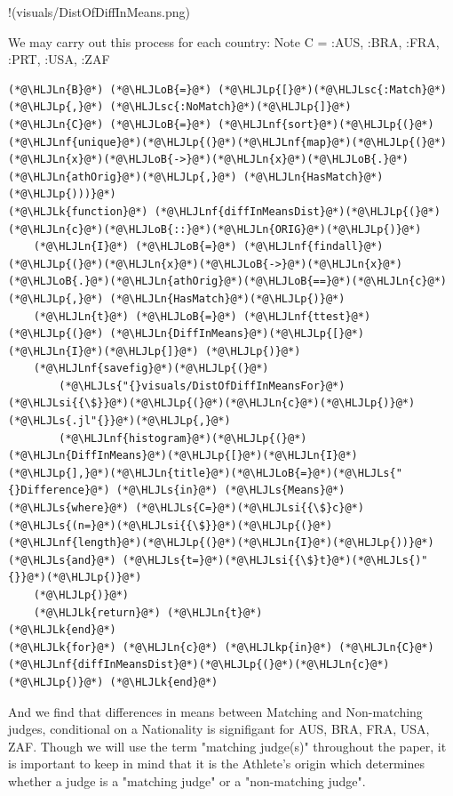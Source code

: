 \documentclass[12pt,a4paper]{article}
\newcommand{\HLJLk}[1]{\textcolor[RGB]{148,91,176}{\textbf{#1}}}
\newcommand{\HLJLkp}[1]{\textcolor[RGB]{148,91,176}{\textbf{#1}}}
\newcommand{\HLJLn}[1]{#1}
\newcommand{\HLJLnf}[1]{\textcolor[RGB]{66,102,213}{#1}}
\newcommand{\HLJLs}[1]{\textcolor[RGB]{201,61,57}{#1}}
\newcommand{\HLJLsc}[1]{\textcolor[RGB]{201,61,57}{#1}}
\newcommand{\HLJLsi}[1]{#1}
\newcommand{\HLJLoB}[1]{\textcolor[RGB]{102,102,102}{\textbf{#1}}}
\newcommand{\HLJLp}[1]{#1}
\begin{document}
!(visuals/DistOfDiffInMeans.png)


We may carry out this process for each country: Note C = :AUS, :BRA, :FRA, :PRT, :USA, :ZAF


\begin{lstlisting}
(*@\HLJLn{B}@*) (*@\HLJLoB{=}@*) (*@\HLJLp{[}@*)(*@\HLJLsc{:Match}@*)(*@\HLJLp{,}@*) (*@\HLJLsc{:NoMatch}@*)(*@\HLJLp{]}@*)
(*@\HLJLn{C}@*) (*@\HLJLoB{=}@*) (*@\HLJLnf{sort}@*)(*@\HLJLp{(}@*)(*@\HLJLnf{unique}@*)(*@\HLJLp{(}@*)(*@\HLJLnf{map}@*)(*@\HLJLp{(}@*)(*@\HLJLn{x}@*)(*@\HLJLoB{->}@*)(*@\HLJLn{x}@*)(*@\HLJLoB{.}@*)(*@\HLJLn{athOrig}@*)(*@\HLJLp{,}@*) (*@\HLJLn{HasMatch}@*)(*@\HLJLp{)))}@*)
(*@\HLJLk{function}@*) (*@\HLJLnf{diffInMeansDist}@*)(*@\HLJLp{(}@*)(*@\HLJLn{c}@*)(*@\HLJLoB{::}@*)(*@\HLJLn{ORIG}@*)(*@\HLJLp{)}@*)
	(*@\HLJLn{I}@*) (*@\HLJLoB{=}@*) (*@\HLJLnf{findall}@*)(*@\HLJLp{(}@*)(*@\HLJLn{x}@*)(*@\HLJLoB{->}@*)(*@\HLJLn{x}@*)(*@\HLJLoB{.}@*)(*@\HLJLn{athOrig}@*)(*@\HLJLoB{==}@*)(*@\HLJLn{c}@*)(*@\HLJLp{,}@*) (*@\HLJLn{HasMatch}@*)(*@\HLJLp{)}@*)
	(*@\HLJLn{t}@*) (*@\HLJLoB{=}@*) (*@\HLJLnf{ttest}@*)(*@\HLJLp{(}@*) (*@\HLJLn{DiffInMeans}@*)(*@\HLJLp{[}@*)(*@\HLJLn{I}@*)(*@\HLJLp{]}@*) (*@\HLJLp{)}@*)
	(*@\HLJLnf{savefig}@*)(*@\HLJLp{(}@*)
		(*@\HLJLs{"{}visuals/DistOfDiffInMeansFor}@*)(*@\HLJLsi{{\$}}@*)(*@\HLJLp{(}@*)(*@\HLJLn{c}@*)(*@\HLJLp{)}@*)(*@\HLJLs{.jl"{}}@*)(*@\HLJLp{,}@*)
		(*@\HLJLnf{histogram}@*)(*@\HLJLp{(}@*)(*@\HLJLn{DiffInMeans}@*)(*@\HLJLp{[}@*)(*@\HLJLn{I}@*)(*@\HLJLp{],}@*)(*@\HLJLn{title}@*)(*@\HLJLoB{=}@*)(*@\HLJLs{"{}Difference}@*) (*@\HLJLs{in}@*) (*@\HLJLs{Means}@*) (*@\HLJLs{where}@*) (*@\HLJLs{C=}@*)(*@\HLJLsi{{\$}c}@*) (*@\HLJLs{(n=}@*)(*@\HLJLsi{{\$}}@*)(*@\HLJLp{(}@*)(*@\HLJLnf{length}@*)(*@\HLJLp{(}@*)(*@\HLJLn{I}@*)(*@\HLJLp{))}@*) (*@\HLJLs{and}@*) (*@\HLJLs{t=}@*)(*@\HLJLsi{{\$}t}@*)(*@\HLJLs{)"{}}@*)(*@\HLJLp{)}@*)
	(*@\HLJLp{)}@*)
	(*@\HLJLk{return}@*) (*@\HLJLn{t}@*)
(*@\HLJLk{end}@*)
(*@\HLJLk{for}@*) (*@\HLJLn{c}@*) (*@\HLJLkp{in}@*) (*@\HLJLn{C}@*) (*@\HLJLnf{diffInMeansDist}@*)(*@\HLJLp{(}@*)(*@\HLJLn{c}@*)(*@\HLJLp{)}@*) (*@\HLJLk{end}@*)
\end{lstlisting}


And we find that differences in means between Matching and Non-matching judges, conditional on a Nationality is signifigant for AUS, BRA, FRA, USA, ZAF. Though we will use the term "matching judge(s)" throughout the paper, it is important to keep in mind that it is the Athlete's origin which determines whether a judge is a "matching judge" or a "non-matching judge".
\end{document}
